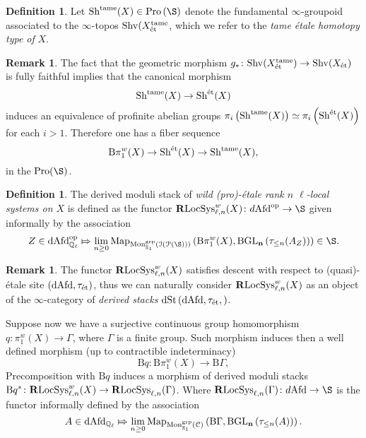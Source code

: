 \documentclass[10pt,a4paper]{amsart}
\numberwithin{equation}{subsection}
\theoremstyle{plain}
\theoremstyle{definition}
\newtheorem{defi}[theorem]{Definition}
\newtheorem{rema}[theorem]{Remark}
\theoremstyle{remark}
\numberwithin{equation}{section}
\begin{document}
\begin{defi}
Let $\Sh^{\tame}(X) \in \pro \left( \S \right)$ denote the fundamental $\infty$-groupoid associated to the $\infty$-topos $\mathrm{Shv}(X_{\text{\'et}}^{\mathrm{tame}}$, which we refer to the \emph{tame \'etale homotopy type of} $X$.
\end{defi}

\begin{rema} \label{tame_vs_et}
The fact that the geometric morphism $g_* \colon \mathrm{Shv}(X_{\text{\'et}}^{\mathrm{tame}} ) \to \mathrm{Shv}(X_{\text{\'et}})$ is fully faithful implies that the canonical morphism 
	\[
		\mathrm{Sh}^{\mathrm{tame}} (X) \to \mathrm{Sh}^{\text{\'et}}(X)
	\]
induces an equivalence of profinite abelian groups $\pi_i \left( \mathrm{Sh}^{\mathrm{tame}} (X) \right) \simeq \pi_i \left( \mathrm{Sh}^{\text{\'et}}(X) \right)$ for each $i>1.$
Therefore one has a fiber sequence
	\[
		\mathrm B \pi_1^w(X) \to \mathrm{Sh}^{\text{\'et}}(X) \to \mathrm{Sh}^{\mathrm{tame}}(X),
	\]
in the \infcat $\pro(\S)$.
\end{rema}


\begin{defi}
The derived moduli stack of \emph{wild (pro)-\'etale rank $n$ $\ell$-local systems on $X$} is defined as the functor $\dLocSys^w(X) \colon d \Afd^{\op} \to \S$ given informally by the association
	\[
		Z \in \dAfdl^{\op} \Mapsto \lim_{n \geq 0} \Map_{\Mon^{\grp}_{\mathbb E_1}(\mathcal{\cI ( \cP ( \S) )})} \left( \mathrm B \pi_1^w(X), \mathbf{ \mathrm B \GLn} \left( \tau_{\leq n}(A_Z) \right) \right) \in \S.
	\]
\end{defi}

\begin{rema}
The functor $ \mathbf R \mathrm{LocSys}_{\ell, n}^w(X)$ satisfies descent with respect to (quasi)-\'etale site $( \mathrm{dAfd}, \tau_{\text{\'et}})$, thus we can naturally consider $ \mathbf R \mathrm{LocSys}_{\ell, n}^w(X)$ as an object of the $\infty$-category of \emph{derived stacks} $\mathrm{dSt} \left( \mathrm{dAfd} , \tau_{\text{\'et}}, \right)$.
\end{rema}

Suppose now we have a surjective continuous group homomorphism $q \colon \pi_1^w(X) \to \Gamma$, where $\Gamma$ is a finite group. Such morphism induces then a well defined morphism (up to contractible indeterminacy) 
	\[
		\mathrm B q \colon \mathrm B \pi_1^w ( X) \to \mathrm B \Gamma,
	\]
Precomposition with $\mathrm B q$ induces a morphism of derived moduli stacks $\mathrm B q^* \colon \mathbf R \mathrm{LocSys}_{\ell, n}^w(X) \to \mathbf R \mathrm{LocSys}_{\ell, n}(\Gamma)$. Where $\dLocSys(\Gamma) \colon d \Afd \to \S$ is the functor informally defined by the association
	\[
		A \in \mathrm{dAfd}_{\mathbb{Q}_\ell} \Mapsto \lim_{n \geq 0} \mathrm{Map}_{\mathrm{Mon}^{\mathrm{grp}}_{\mathbb E_1}( \mathcal{C})} \left( \mathrm B \Gamma, \mathbf{ \mathrm B \mathrm{GL}_n } \left( \tau_{\leq n} (A) \right) \right).
	\]	
\end{document}
